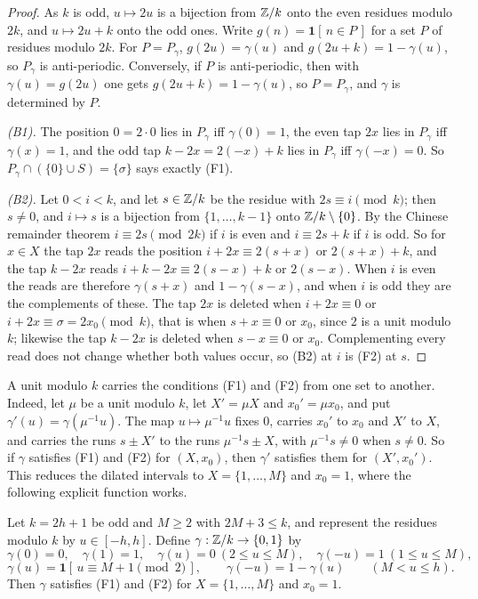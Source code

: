 \begin{proof}
As $k$ is odd, $u\mapsto 2u$ is a bijection from $\mathbb{Z}/k$ onto the even
residues modulo $2k$, and $u\mapsto2u+k$ onto the odd ones. Write
$g(n)=\mathbf 1[\,n\in P\,]$ for a set $P$ of residues modulo $2k$. For
$P=P_\gamma$, $g(2u)=\gamma(u)$ and $g(2u+k)=1-\gamma(u)$, so $P_\gamma$ is
anti-periodic. Conversely, if $P$ is anti-periodic, then with
$\gamma(u)=g(2u)$ one gets $g(2u+k)=1-\gamma(u)$, so $P=P_\gamma$, and
$\gamma$ is determined by $P$.

\emph{(B1).} The position $0=2\cdot0$ lies in $P_\gamma$ iff $\gamma(0)=1$,
the even tap $2x$ lies in $P_\gamma$ iff $\gamma(x)=1$, and the
odd tap $k-2x=2(-x)+k$ lies in $P_\gamma$ iff $\gamma(-x)=0$. So
$P_\gamma\cap(\{0\}\cup S)=\{\sigma\}$ says exactly (F1).

\emph{(B2).} Let $0<i<k$, and let $s\in\mathbb{Z}/k$ be the residue with
$2s\equiv i\pmod k$; then $s\ne0$, and $i\mapsto s$ is a bijection from
$\{1,\dots,k-1\}$ onto $\mathbb{Z}/k\setminus\{0\}$. By the Chinese remainder
theorem $i\equiv2s\pmod{2k}$ if $i$ is even and $i\equiv2s+k$ if $i$ is
odd. So for $x\in X$ the tap $2x$ reads the position
$i+2x\equiv2(s+x)$ or $2(s+x)+k$, and the tap $k-2x$ reads
$i+k-2x\equiv2(s-x)+k$ or $2(s-x)$. When $i$ is even the reads are therefore
$\gamma(s+x)$ and $1-\gamma(s-x)$, and when $i$ is odd they are the
complements of these. The tap $2x$ is deleted when $i+2x\equiv0$ or
$i+2x\equiv\sigma=2x_0\pmod k$, that is when $s+x\equiv0$ or $x_0$, since $2$ is a unit
modulo $k$; likewise the tap $k-2x$ is deleted when $s-x\equiv0$ or $x_0$.
Complementing every read does not change whether both values occur, so
(B2) at $i$ is (F2) at $s$.
\end{proof}

A unit modulo $k$ carries the conditions (F1) and (F2) from one set to
another. Indeed, let $\mu$ be a unit modulo $k$, let $X'=\mu X$ and
$x_0'=\mu x_0$, and put $\gamma'(u)=\gamma(\mu^{-1}u)$. The map
$u\mapsto\mu^{-1}u$ fixes $0$, carries $x_0'$ to $x_0$ and $X'$ to $X$, and
carries the runs $s\pm X'$ to the runs $\mu^{-1}s\pm X$, with
$\mu^{-1}s\ne0$ when $s\ne0$. So if $\gamma$ satisfies (F1) and (F2) for
$(X,x_0)$, then $\gamma'$ satisfies them for $(X',x_0')$. This reduces the
dilated intervals to $X=\{1,\dots,M\}$ and $x_0=1$, where the following
explicit function works.

\begin{theorem}
\label{thm:odd-rowcarrier}
Let $k=2h+1$ be odd and $M\ge2$ with $2M+3\le k$, and represent the residues
modulo $k$ by $u\in[-h,h]$. Define $\gamma:\mathbb{Z}/k\to\{0,1\}$ by
\[
\gamma(0)=0,\quad \gamma(1)=1,\quad \gamma(u)=0\ (2\le u\le M),\quad
\gamma(-u)=1\ (1\le u\le M),
\]
\[
\gamma(u)=\mathbf 1[\,u\equiv M+1\pmod 2\,],\qquad \gamma(-u)=1-\gamma(u)
\qquad(M<u\le h).
\]
Then $\gamma$ satisfies (F1) and (F2) for $X=\{1,\dots,M\}$ and $x_0=1$.
\end{theorem}

